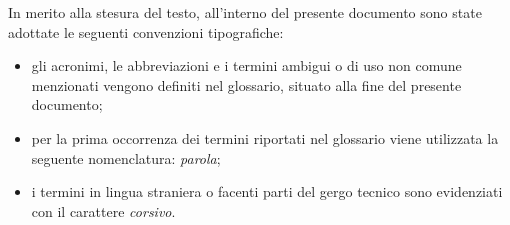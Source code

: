 In merito alla stesura del testo, all'interno del presente documento sono state adottate le seguenti convenzioni tipografiche:
\begin{itemize}
      \item gli acronimi, le abbreviazioni e i termini ambigui o di uso non comune menzionati vengono definiti nel glossario, situato alla fine del presente documento;
      \item per la prima occorrenza dei termini riportati nel glossario viene utilizzata la seguente nomenclatura: \textit{parola}\glox\gloxspacing;
      \item i termini in lingua straniera o facenti parti del gergo tecnico sono evidenziati con il carattere \textit{corsivo}.
\end{itemize}
